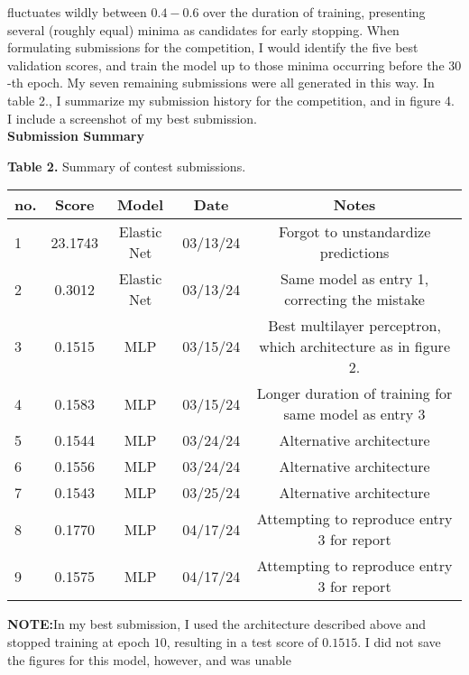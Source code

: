 \documentclass[11pt]{article}
\newcommand{\1}[1]{\mathbbm{1}_{#1}}
\begin{document}
fluctuates wildly between $0.4-0.6$ over the duration of training, presenting several (roughly equal) minima as candidates for early stopping. When formulating submissions for the competition, I would identify the five best validation scores, and train the model up to those minima occurring before the $30$-th epoch.
My seven remaining submissions were all generated in this way. In table 2., I summarize my submission history for the competition, and in figure 4. I include a screenshot of my best submission.\\[5pt]
{\bf\large Submission Summary}
\begin{center}
    \begin{minipage}{\dimexpr\paperwidth-5cm}
        {\bf Table 2.} Summary of contest submissions. 
    \end{minipage}
\end{center}
\begin{center}
    \begin{tabular}{@{}l|cccc@{}}\toprule
        no. & Score & Model & Date & Notes  \\\midrule
        1 & 23.1743 & Elastic Net & 03/13/24 & Forgot to unstandardize predictions\\
        2 & 0.3012 & Elastic Net & 03/13/24 & Same model as entry 1, correcting the mistake\\
        3 & 0.1515 & MLP & 03/15/24 & Best multilayer perceptron, which architecture as in figure 2.\\
        4 & 0.1583 & MLP & 03/15/24 & Longer duration of training for same model as entry 3\\
        5 & 0.1544 & MLP & 03/24/24 & Alternative architecture\\
        6 & 0.1556 & MLP & 03/24/24 & Alternative architecture\\
        7 & 0.1543 & MLP & 03/25/24 & Alternative architecture\\
        8 & 0.1770 & MLP & 04/17/24 & Attempting to reproduce entry 3 for report\\
        9 & 0.1575 & MLP & 04/17/24 & Attempting to reproduce entry 3 for report\\
        \bottomrule
    \end{tabular}
\end{center}
{\bf NOTE:}\hspace{5pt}In my best submission, I used the architecture described above and stopped training at epoch $10$, resulting in a test score of $0.1515$. I did not save the figures for this model, however, and was unable
\end{document}

